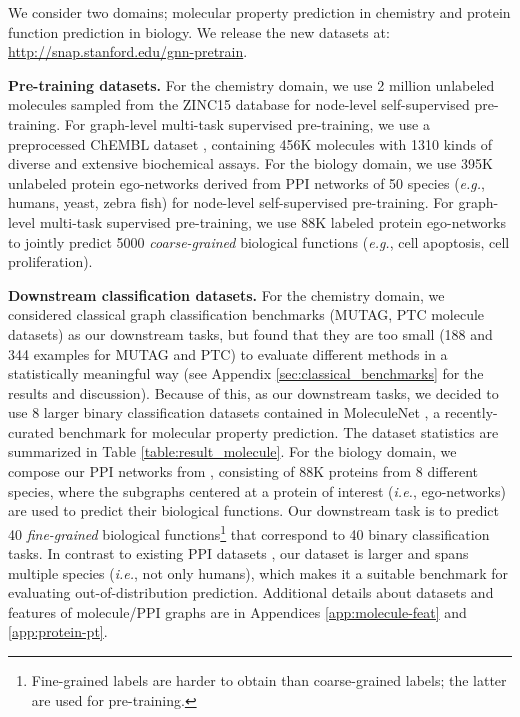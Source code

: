 \documentclass{article} \usepackage{iclr2020_conference,times}
\numberwithin{equation}{section}
\theoremstyle{plain}
\theoremstyle{definition}
\theoremstyle{remark}
\newcommand{\ie}{\textit{i.e.}}
\newcommand{\eg}{\textit{e.g.}}
\begin{document}
We consider two domains; molecular property prediction in chemistry and protein function prediction in biology.  We release the new datasets at: \url{http://snap.stanford.edu/gnn-pretrain}. 

{\bf Pre-training datasets.} For the chemistry domain, we use 2 million unlabeled molecules sampled from the ZINC15 database \citep{sterling2015} for node-level self-supervised pre-training.
For graph-level multi-task supervised pre-training, we use a preprocessed ChEMBL dataset \citep{mayr2018large,gaulton2011chembl}, containing 456K molecules with 1310 kinds of diverse and extensive biochemical assays. For the biology domain, we use 395K unlabeled protein ego-networks derived from PPI networks of 50 species (\eg, humans, yeast, zebra fish) for node-level self-supervised pre-training. For graph-level multi-task supervised pre-training, we use 88K labeled protein ego-networks to jointly predict 5000 \emph{coarse-grained} biological functions (\eg, cell apoptosis, cell proliferation).


{\bf Downstream classification datasets.}  
For the chemistry domain, we considered classical graph classification benchmarks (MUTAG, PTC molecule datasets) \citep{kersting2016benchmark,xu2018how} as our downstream tasks, but found that they are too small (188 and 344 examples for MUTAG and PTC) to evaluate different methods in a statistically meaningful way (see Appendix \ref{sec:classical_benchmarks} for the results and discussion).
Because of this, as our downstream tasks, we decided to use 8 larger binary classification datasets contained in MoleculeNet \citep{wu2018moleculenet}, a recently-curated benchmark for molecular property prediction. 
The dataset statistics are summarized in Table \ref{table:result_molecule}.
For the biology domain, we compose our PPI networks from \citet{Zitnik2019}, consisting of 88K proteins from 8 different species, 
where the subgraphs centered at a protein of interest (\ie, ego-networks) are used to predict their biological functions. Our downstream task is to predict 40 \emph{fine-grained} biological functions\footnote{Fine-grained labels are harder to obtain than coarse-grained labels; the latter are used for pre-training.} that correspond to 40 binary classification tasks.
In contrast to existing PPI datasets \citep{hamilton2017inductive}, our dataset is larger and spans multiple species (\ie, not only humans), which makes it a suitable benchmark for evaluating out-of-distribution prediction.
Additional details about datasets and features of molecule/PPI graphs are in Appendices \ref{app:molecule-feat} and \ref{app:protein-pt}.
\end{document}
